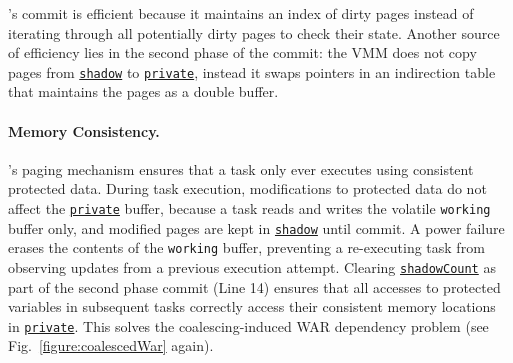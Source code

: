 \sys's commit is efficient because it maintains an index of dirty pages instead of iterating through all potentially dirty pages to check their state.
Another source of efficiency lies in the second phase of the commit:
the VMM does not copy pages from \texttt{\underline{shadow}} to \texttt{\underline{private}}, instead it swaps pointers in an indirection table that maintains the pages as a double buffer.

\paragraph{Memory Consistency.}
\sys's paging mechanism ensures that a task only ever executes using consistent protected data. During task execution, modifications to protected data do not affect the \texttt{\underline{private}} buffer, because a task reads and writes the volatile \texttt{working} buffer only, and modified pages are kept in \texttt{\underline{shadow}} until commit. A power failure erases the contents of the \texttt{working} buffer, preventing a re-executing task from observing updates from a previous execution attempt. Clearing \texttt{\underline{shadowCount}} as part of the second phase commit (Line 14) ensures that all accesses to protected variables in subsequent tasks correctly access their consistent memory locations in \texttt{\underline{private}}. This solves the coalescing-induced WAR dependency problem (see Fig.~\ref{figure:coalescedWar} again).

